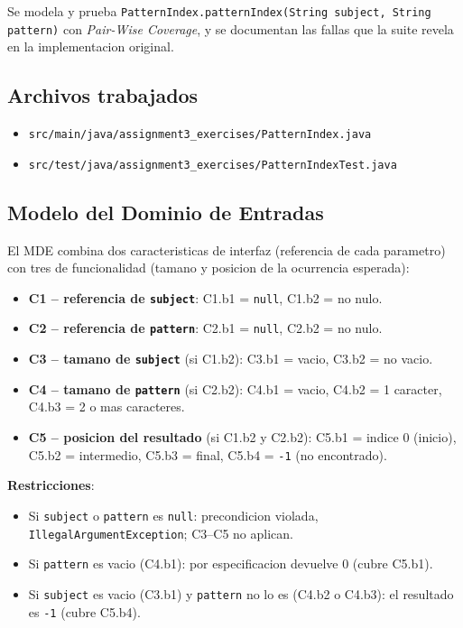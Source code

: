 \documentclass[12pt,a4paper]{article}
\begin{document}
Se modela y prueba \texttt{PatternIndex.patternIndex(String subject, String pattern)} con
\textit{Pair-Wise Coverage}, y se documentan las fallas que la suite revela en la implementacion
original.

\subsection{Archivos trabajados}

\begin{itemize}
  \item \texttt{src/main/java/assignment3\_exercises/PatternIndex.java}
  \item \texttt{src/test/java/assignment3\_exercises/PatternIndexTest.java}
\end{itemize}

\subsection{Modelo del Dominio de Entradas}

El MDE combina dos caracteristicas de interfaz (referencia de cada parametro) con tres de
funcionalidad (tamano y posicion de la ocurrencia esperada):

\begin{itemize}
  \item \textbf{C1 -- referencia de \texttt{subject}}: C1.b1 = \texttt{null}, C1.b2 = no nulo.
  \item \textbf{C2 -- referencia de \texttt{pattern}}: C2.b1 = \texttt{null}, C2.b2 = no nulo.
  \item \textbf{C3 -- tamano de \texttt{subject}} (si C1.b2): C3.b1 = vacio, C3.b2 = no vacio.
  \item \textbf{C4 -- tamano de \texttt{pattern}} (si C2.b2): C4.b1 = vacio, C4.b2 = 1 caracter,
  C4.b3 = 2 o mas caracteres.
  \item \textbf{C5 -- posicion del resultado} (si C1.b2 y C2.b2): C5.b1 = indice 0 (inicio),
  C5.b2 = intermedio, C5.b3 = final, C5.b4 = \texttt{-1} (no encontrado).
\end{itemize}

\textbf{Restricciones}:
\begin{itemize}
  \item Si \texttt{subject} o \texttt{pattern} es \texttt{null}: precondicion violada,
  \texttt{IllegalArgumentException}; C3--C5 no aplican.
  \item Si \texttt{pattern} es vacio (C4.b1): por especificacion devuelve 0 (cubre C5.b1).
  \item Si \texttt{subject} es vacio (C3.b1) y \texttt{pattern} no lo es (C4.b2 o C4.b3): el
  resultado es \texttt{-1} (cubre C5.b4).
\end{itemize}
\end{document}
